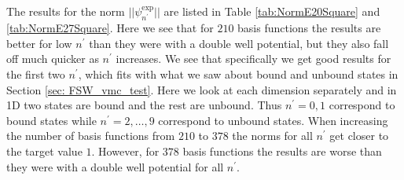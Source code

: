\documentclass[../main.tex]{subfiles}
\begin{document}
The results for the norm $||\psi_{n^\prime}^\textrm{exp}||$ are listed in Table \ref{tab:NormE20Square} and \ref{tab:NormE27Square}. Here we see that for $210$ basis functions the results are better for low $n^\prime$ than they were with a double well potential, but they also fall off much quicker as $n^\prime$ increases. We see that specifically we get good results for the first two $n^\prime$, which fits with what we saw about bound and unbound states in Section \ref{sec: FSW_vmc_test}. Here we look at each dimension separately and in 1D two states are bound and the rest are unbound. Thus $n^\prime = 0,1$ correspond to bound states while $n^\prime = 2,\dots,9$ correspond to unbound states. When increasing the number of basis functions from $210$ to $378$ the norms for all $n^\prime$ get closer to the target value $1$. However, for $378$ basis functions the results are worse than they were with a double well potential for all $n^\prime$.
\end{document}
